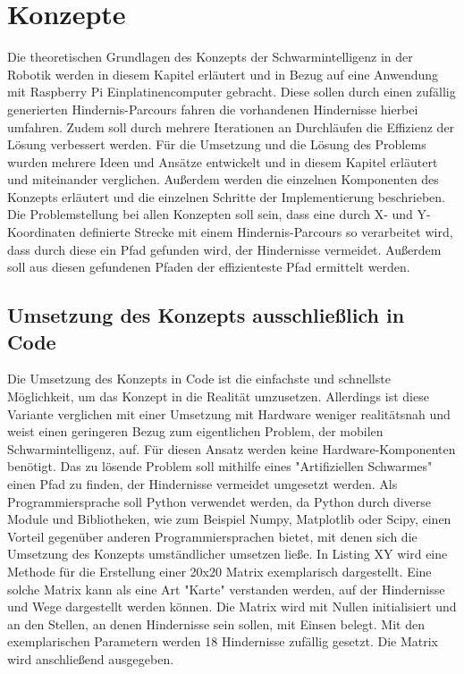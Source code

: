 \section{Konzepte}
Die theoretischen Grundlagen des Konzepts der Schwarmintelligenz in der Robotik werden in diesem Kapitel erläutert und in Bezug auf eine Anwendung mit Raspberry Pi Einplatinencomputer gebracht. Diese sollen durch einen zufällig generierten Hindernis-Parcours fahren die vorhandenen Hindernisse hierbei umfahren. Zudem soll durch mehrere Iterationen an Durchläufen die Effizienz der Lösung verbessert werden. Für die Umsetzung und die Lösung des Problems wurden mehrere Ideen und Ansätze entwickelt und in diesem Kapitel erläutert und miteinander verglichen. Außerdem werden die einzelnen Komponenten des Konzepts erläutert und die einzelnen Schritte der Implementierung beschrieben. Die Problemstellung bei allen Konzepten soll sein, dass eine durch X- und Y-Koordinaten definierte Strecke mit einem Hindernis-Parcours so verarbeitet wird, dass durch diese ein Pfad gefunden wird, der Hindernisse vermeidet. Außerdem soll aus diesen gefundenen Pfaden der effizienteste Pfad ermittelt werden.

\subsection{Umsetzung des Konzepts ausschließlich in Code}
Die Umsetzung des Konzepts in Code ist die einfachste und schnellste Möglichkeit, um das Konzept in die Realität umzusetzen. Allerdings ist diese Variante verglichen mit einer Umsetzung mit Hardware weniger realitätsnah und weist einen geringeren Bezug zum eigentlichen Problem, der mobilen Schwarmintelligenz, auf. Für diesen Ansatz werden keine Hardware-Komponenten benötigt. Das zu lösende Problem soll mithilfe eines "Artifiziellen Schwarmes" einen Pfad zu finden, der Hindernisse vermeidet umgesetzt werden. Als Programmiersprache soll Python verwendet werden, da Python durch diverse Module und Bibliotheken, wie zum Beispiel Numpy, Matplotlib oder Scipy, einen Vorteil gegenüber anderen Programmiersprachen bietet, mit denen sich die Umsetzung des Konzepts umständlicher umsetzen ließe. In Listing XY wird eine Methode für die Erstellung einer 20x20 Matrix exemplarisch dargestellt. Eine solche Matrix kann als eine Art "Karte" verstanden werden, auf der Hindernisse und Wege dargestellt werden können. Die Matrix wird mit Nullen initialisiert und an den Stellen, an denen Hindernisse sein sollen, mit Einsen belegt. Mit den exemplarischen Parametern werden 18 Hindernisse zufällig gesetzt. Die Matrix wird anschließend ausgegeben.

